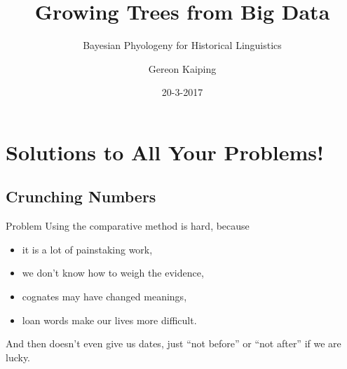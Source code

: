 \documentclass[9pt]{beamer}
\title{Growing Trees from Big Data}
\subtitle{Bayesian Phyologeny for Historical Linguistics}
\author{Gereon Kaiping}
\date{20-3-2017}
\begin{document}
\begin{frame}[plain]
  \titlepage
\end{frame}
\begin{frame}
  \tableofcontents
\end{frame}
\section{Solutions to All Your Problems!}
\subsection{Crunching Numbers}
\begin{frame}{Problem}
  Using the comparative method is hard, because
  \begin{itemize}
  \item it is a lot of painstaking work,
  \item we don't know how to weigh the evidence,
  \item cognates may have changed meanings,
  \item loan words make our lives more difficult.
  \end{itemize}
  \pause
  And then doesn't even give us dates, just “not before” or “not after” if we are lucky.
\end{frame}
\end{document}
